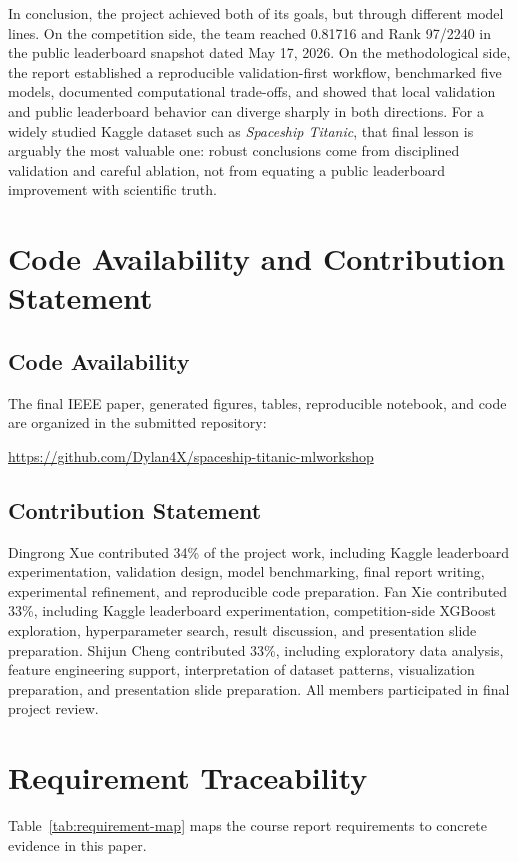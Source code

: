 \documentclass[conference]{IEEEtran}
\begin{document}
In conclusion, the project achieved both of its goals, but through different model lines. On the competition side, the team reached 0.81716 and Rank 97/2240 in the public leaderboard snapshot dated May 17, 2026. On the methodological side, the report established a reproducible validation-first workflow, benchmarked five models, documented computational trade-offs, and showed that local validation and public leaderboard behavior can diverge sharply in both directions. For a widely studied Kaggle dataset such as \emph{Spaceship Titanic}, that final lesson is arguably the most valuable one: robust conclusions come from disciplined validation and careful ablation, not from equating a public leaderboard improvement with scientific truth.

\section{Code Availability and Contribution Statement}
\subsection{Code Availability}
The final IEEE paper, generated figures, tables, reproducible notebook, and code are organized in the submitted repository:

\begin{center}
\url{https://github.com/Dylan4X/spaceship-titanic-mlworkshop}
\end{center}

\subsection{Contribution Statement}
Dingrong Xue contributed 34\% of the project work, including Kaggle leaderboard experimentation, validation design, model benchmarking, final report writing, experimental refinement, and reproducible code preparation. Fan Xie contributed 33\%, including Kaggle leaderboard experimentation, competition-side XGBoost exploration, hyperparameter search, result discussion, and presentation slide preparation. Shijun Cheng contributed 33\%, including exploratory data analysis, feature engineering support, interpretation of dataset patterns, visualization preparation, and presentation slide preparation. All members participated in final project review.

\appendices
\section{Requirement Traceability}
Table~\ref{tab:requirement-map} maps the course report requirements to concrete evidence in this paper.
\end{document}
